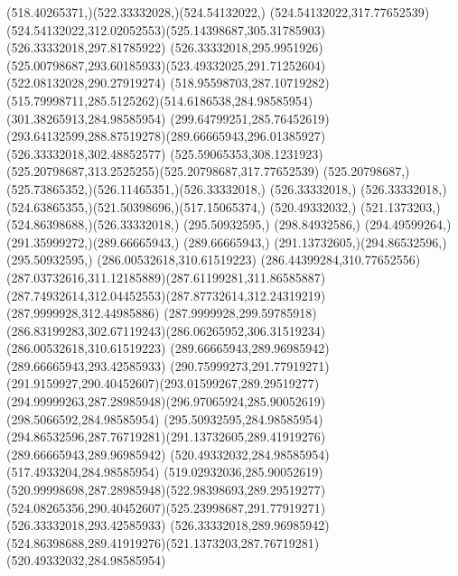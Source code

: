 {{	\curveto(518.40265371,)(522.33332028,)(524.54132022,)
	\lineto(524.54132022,317.77652539)
	\curveto(524.54132022,312.02052553)(525.14398687,305.31785903)(526.33332018,297.81785922)
	\lineto(526.33332018,295.9951926)
	\curveto(525.00798687,293.60185933)(523.49332025,291.71252604)(522.08132028,290.27919274)
	\curveto(518.95598703,287.10719282)(515.79998711,285.5125262)(514.6186538,284.98585954)
	\lineto(301.38265913,284.98585954)
	\curveto(299.64799251,285.76452619)(293.64132599,288.87519278)(289.66665943,296.01385927)
	\closepath
	\moveto(526.33332018,302.48852577)
	\curveto(525.59065353,308.1231923)(525.20798687,313.2525255)(525.20798687,317.77652539)
	\lineto(525.20798687,)
	\curveto(525.73865352,)(526.11465351,)(526.33332018,)
	\closepath
	\moveto(526.33332018,)
	\lineto(526.33332018,)
	\curveto(524.63865355,)(521.50398696,)(517.15065374,)
	\lineto(520.49332032,)
	\curveto(521.1373203,)(524.86398688,)(526.33332018,)
	\moveto(295.50932595,)
	\lineto(298.84932586,)
	\curveto(294.49599264,)(291.35999272,)(289.66665943,)
	\lineto(289.66665943,)
	\curveto(291.13732605,)(294.86532596,)(295.50932595,)
	\moveto(286.00532618,310.61519223)
	\curveto(286.44399284,310.77652556)(287.03732616,311.12185889)(287.61199281,311.86585887)
	\curveto(287.74932614,312.04452553)(287.87732614,312.24319219)(287.9999928,312.44985886)
	\lineto(287.9999928,299.59785918)
	\curveto(286.83199283,302.67119243)(286.06265952,306.31519234)(286.00532618,310.61519223)
	\moveto(289.66665943,289.96985942)
	\lineto(289.66665943,293.42585933)
	\curveto(290.75999273,291.77919271)(291.9159927,290.40452607)(293.01599267,289.29519277)
	\curveto(294.99999263,287.28985948)(296.97065924,285.90052619)(298.5066592,284.98585954)
	\lineto(295.50932595,284.98585954)
	\curveto(294.86532596,287.76719281)(291.13732605,289.41919276)(289.66665943,289.96985942)
	\moveto(520.49332032,284.98585954)
	\lineto(517.4933204,284.98585954)
	\curveto(519.02932036,285.90052619)(520.99998698,287.28985948)(522.98398693,289.29519277)
	\curveto(524.08265356,290.40452607)(525.23998687,291.77919271)(526.33332018,293.42585933)
	\lineto(526.33332018,289.96985942)
	\curveto(524.86398688,289.41919276)(521.1373203,287.76719281)(520.49332032,284.98585954)
}
}


